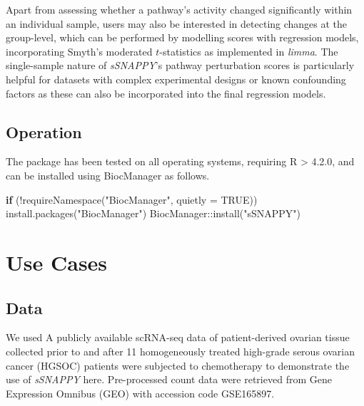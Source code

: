 \documentclass[9pt,a4paper,]{extarticle}
\newenvironment{Shaded}{\begin{snugshade}}{\end{snugshade}}
\newcommand{\AttributeTok}[1]{\textcolor[rgb]{0.77,0.63,0.00}{#1}}
\newcommand{\ConstantTok}[1]{\textcolor[rgb]{0.00,0.00,0.00}{#1}}
\newcommand{\ControlFlowTok}[1]{\textcolor[rgb]{0.13,0.29,0.53}{\textbf{#1}}}
\newcommand{\FunctionTok}[1]{\textcolor[rgb]{0.00,0.00,0.00}{#1}}
\newcommand{\NormalTok}[1]{#1}
\newcommand{\SpecialCharTok}[1]{\textcolor[rgb]{0.00,0.00,0.00}{#1}}
\newcommand{\StringTok}[1]{\textcolor[rgb]{0.31,0.60,0.02}{#1}}
\begin{document}
Apart from assessing whether a pathway's activity changed significantly within an individual sample, users may also be interested in detecting changes at the group-level, which can be performed by modelling scores with regression models, incorporating Smyth's moderated \(t\)-statistics\citep{Smyth_2004} as implemented in \emph{limma}\citep{limma_2015}.
The single-sample nature of \emph{sSNAPPY}'s pathway perturbation scores is particularly helpful for datasets with complex experimental designs or known confounding factors as these can also be incorporated into the final regression models.

\hypertarget{operation}{%
\subsection{Operation}\label{operation}}

The package has been tested on all operating systems, requiring R \textgreater{} 4.2.0, and can be installed using BiocManager as follows.

\begin{Shaded}
\begin{Highlighting}[]
\ControlFlowTok{if}\NormalTok{ (}\SpecialCharTok{!}\FunctionTok{requireNamespace}\NormalTok{(}\StringTok{"BiocManager"}\NormalTok{, }\AttributeTok{quietly =} \ConstantTok{TRUE}\NormalTok{))}
  \FunctionTok{install.packages}\NormalTok{(}\StringTok{"BiocManager"}\NormalTok{)}
\NormalTok{BiocManager}\SpecialCharTok{::}\FunctionTok{install}\NormalTok{(}\StringTok{"sSNAPPY"}\NormalTok{)}
\end{Highlighting}
\end{Shaded}

\hypertarget{use-cases}{%
\section{Use Cases}\label{use-cases}}

\hypertarget{data}{%
\subsection{Data}\label{data}}

We used A publicly available scRNA-seq data of patient-derived ovarian tissue collected prior to and after 11 homogeneously treated high-grade serous ovarian cancer (HGSOC) patients were subjected to chemotherapy\citep{Zhang2022} to demonstrate the use of \emph{sSNAPPY} here. Pre-processed count data were retrieved from Gene Expression Omnibus (GEO) with accession code GSE165897.
\end{document}
